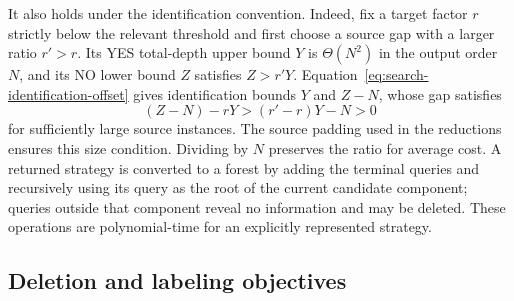 It also holds under the identification convention. Indeed, fix a target
factor $r$ strictly below the relevant threshold and first choose a
source gap with a larger ratio $r'>r$. Its YES total-depth upper bound
$Y$ is $\Theta(N^2)$ in the output order $N$, and its NO lower bound
$Z$ satisfies $Z>r'Y$. Equation~\eqref{eq:search-identification-offset}
gives identification bounds $Y$ and $Z-N$, whose gap satisfies
\[
 (Z-N)-rY>(r'-r)Y-N>0
\]
for sufficiently large source instances. The source padding used in
the reductions ensures this size condition. Dividing by $N$ preserves
the ratio for average cost. A returned strategy is converted to a
forest by adding the terminal queries and recursively using its query
as the root of the current candidate component; queries outside that
component reveal no information and may be deleted. These operations
are polynomial-time for an explicitly represented strategy.

\subsection{Deletion and labeling objectives}
\label{subsec:deletion-labeling}

